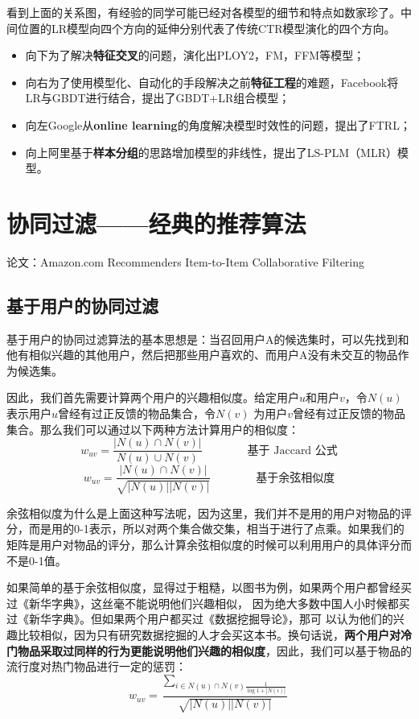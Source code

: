 \documentclass[12pt]{article}
\begin{document}
看到上面的关系图，有经验的同学可能已经对各模型的细节和特点如数家珍了。中间位置的LR模型向四个方向的延伸分别代表了传统CTR模型演化的四个方向。
\begin{itemize}
\setlength{\itemsep}{0pt}
\setlength{\parsep}{0pt}
\setlength{\parskip}{0pt}
    \item 向下为了解决\textbf{特征交叉}的问题，演化出PLOY2，FM，FFM等模型；
    \item 向右为了使用模型化、自动化的手段解决之前\textbf{特征工程}的难题，Facebook将LR与GBDT进行结合，提出了GBDT+LR组合模型；
    \item 向左Google从\textbf{online learning}的角度解决模型时效性的问题，提出了FTRL；
    \item 向上阿里基于\textbf{样本分组}的思路增加模型的非线性，提出了LS-PLM（MLR）模型。
\end{itemize}

\section{协同过滤——经典的推荐算法}
论文：Amazon.com Recommenders Item-to-Item Collaborative Filtering

\subsection{基于用户的协同过滤}
基于用户的协同过滤算法的基本思想是：当召回用户A的候选集时，可以先找到和他有相似兴趣的其他用户，然后把那些用户喜欢的、而用户A没有未交互的物品作为候选集。

因此，我们首先需要计算两个用户的兴趣相似度。给定用户$u$和用户$v$，令$N(u)$表示用户$u$曾经有过正反馈的物品集合，令$N(v)$ 为用户$v$曾经有过正反馈的物品集合。那么我们可以通过以下两种方法计算用户的相似度：
$$
w_{uv} = \frac{|N(u) \cap N(v)|}{N(u) \cup N(v)} \qquad \qquad \text{基于 Jaccard 公式}
$$
$$
w_{uv} = \frac{|N(u) \cap N(v)|}{\sqrt{|N(u)| |N(v)|}} \qquad \qquad \text{基于余弦相似度}
$$

余弦相似度为什么是上面这种写法呢，因为这里，我们并不是用的用户对物品的评分，而是用的0-1表示，所以对两个集合做交集，相当于进行了点乘。如果我们的矩阵是用户对物品的评分，那么计算余弦相似度的时候可以利用用户的具体评分而不是0-1值。

如果简单的基于余弦相似度，显得过于粗糙，以图书为例，如果两个用户都曾经买过《新华字典》，这丝毫不能说明他们兴趣相似， 因为绝大多数中国人小时候都买过《新华字典》。但如果两个用户都买过《数据挖掘导论》，那可 以认为他们的兴趣比较相似，因为只有研究数据挖掘的人才会买这本书。换句话说，\textbf{两个用户对冷门物品采取过同样的行为更能说明他们兴趣的相似度}，因此，我们可以基于物品的流行度对热门物品进行一定的惩罚：
$$
w_{uv} = \frac{\sum_{i \in N(u)\cap N(v)\frac{1}{\log 1 + |N(i)|}}}{\sqrt{|N(u)| |N(v)|}}
$$
\end{document}
